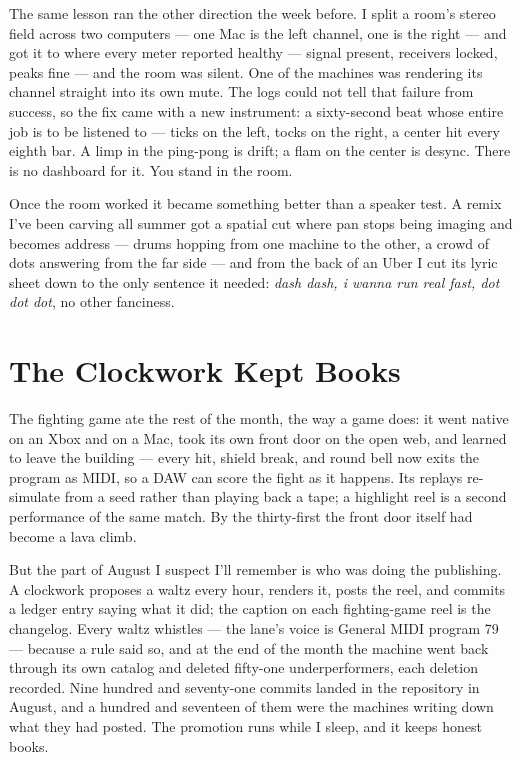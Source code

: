 \documentclass[11pt,letterpaper]{article}
\begin{document}
The same lesson ran the other direction the week before. I split a room's stereo field across two computers --- one Mac is the left channel, one is the right --- and got it to where every meter reported healthy --- signal present, receivers locked, peaks fine --- and the room was silent. One of the machines was rendering its channel straight into its own mute. The logs could not tell that failure from success, so the fix came with a new instrument: a sixty-second beat whose entire job is to be listened to --- ticks on the left, tocks on the right, a center hit every eighth bar. A limp in the ping-pong is drift; a flam on the center is desync. There is no dashboard for it. You stand in the room.

Once the room worked it became something better than a speaker test. A remix I've been carving all summer got a spatial cut where pan stops being imaging and becomes address --- drums hopping from one machine to the other, a crowd of dots answering from the far side --- and from the back of an Uber I cut its lyric sheet down to the only sentence it needed: \textit{dash dash, i wanna run real fast, dot dot dot}, no other fanciness.

\section{The Clockwork Kept Books}

The fighting game ate the rest of the month, the way a game does: it went native on an Xbox and on a Mac, took its own front door on the open web, and learned to leave the building --- every hit, shield break, and round bell now exits the program as MIDI, so a DAW can score the fight as it happens. Its replays re-simulate from a seed rather than playing back a tape; a highlight reel is a second performance of the same match. By the thirty-first the front door itself had become a lava climb.

But the part of August I suspect I'll remember is who was doing the publishing. A clockwork proposes a waltz every hour, renders it, posts the reel, and commits a ledger entry saying what it did; the caption on each fighting-game reel is the changelog. Every waltz whistles --- the lane's voice is General MIDI program 79 --- because a rule said so, and at the end of the month the machine went back through its own catalog and deleted fifty-one underperformers, each deletion recorded. Nine hundred and seventy-one commits landed in the repository in August, and a hundred and seventeen of them were the machines writing down what they had posted. The promotion runs while I sleep, and it keeps honest books.
\end{document}
